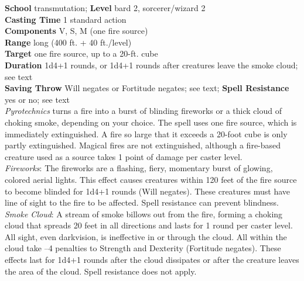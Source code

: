\textbf{School} transmutation; \textbf{Level} bard 2, sorcerer/wizard 2\\
\textbf{Casting Time} 1 standard action\\
\textbf{Components} V, S, M (one fire source)\\
\textbf{Range} long (400 ft. + 40 ft./level)\\
\textbf{Target} one fire source, up to a 20-ft. cube\\
\textbf{Duration} 1d4+1 rounds, or 1d4+1 rounds after creatures leave the smoke cloud; see text\\
\textbf{Saving Throw }Will negates or Fortitude negates; see text; \textbf{Spell Resistance} yes or no; see text\\
\textit{Pyrotechnics }turns a fire into a burst of blinding fireworks or a thick cloud of choking smoke, depending on your choice. The spell uses one fire source, which is immediately extinguished. A fire so large that it exceeds a 20-foot cube is only partly extinguished. Magical fires are not extinguished, although a fire-based creature used as a source takes 1 point of damage per caster level.\\
\textit{Fireworks}: The fireworks are a flashing, fiery, momentary burst of glowing, colored aerial lights. This effect causes creatures within 120 feet of the fire source to become blinded for 1d4+1 rounds (Will negates). These creatures must have line of sight to the fire to be affected. Spell resistance can prevent blindness.\\
\textit{Smoke Cloud}: A stream of smoke billows out from the fire, forming a choking cloud that spreads 20 feet in all directions and lasts for 1 round per caster level. All sight, even darkvision, is ineffective in or through the cloud. All within the cloud take –4 penalties to Strength and Dexterity (Fortitude negates). These effects last for 1d4+1 rounds after the cloud dissipates or after the creature leaves the area of the cloud. Spell resistance does not apply.\\
